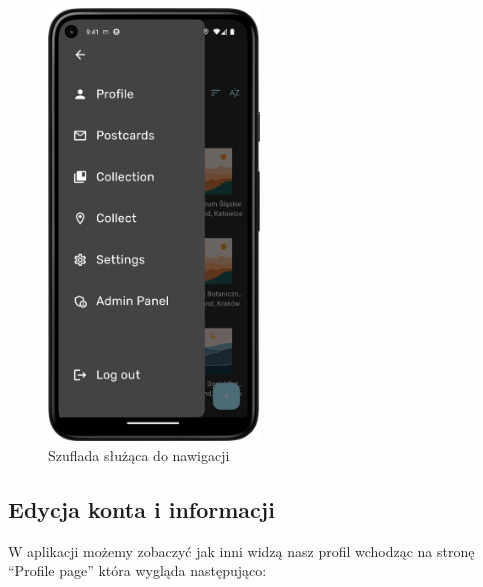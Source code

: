 \documentclass[a4paper,twoside,12pt]{book}
\begin{document}
\begin{figure}[H]
    \centering
    \includegraphics[width=0.5\textwidth]{mobile_ss/szuflada.png}
    \caption{Szuflada służąca do nawigacji}
\end{figure}

\subsection{Edycja konta i informacji}
W aplikacji możemy zobaczyć jak inni widzą nasz profil wchodząc na stronę ``Profile page'' która wygląda następująco:
\end{document}
